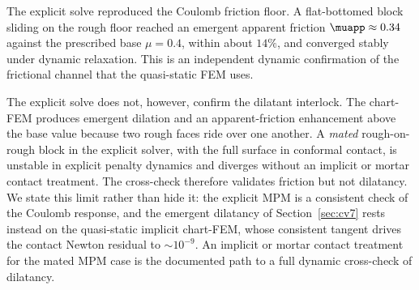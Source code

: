 The explicit solve reproduced the Coulomb friction floor. A flat-bottomed block sliding on the rough floor
reached an emergent apparent friction $\muapp\approx0.34$ against the prescribed base $\mu=0.4$, within
about $14\%$, and converged stably under dynamic relaxation. This is an independent dynamic confirmation
of the frictional channel that the quasi-static FEM uses.

The explicit solve does not, however, confirm the dilatant interlock. The chart-FEM produces emergent
dilation and an apparent-friction enhancement above the base value because two rough faces ride over one
another. A \emph{mated} rough-on-rough block in the explicit solver, with the full surface in conformal
contact, is unstable in explicit penalty dynamics and diverges without an implicit or mortar contact
treatment. The cross-check therefore validates friction but not dilatancy. We state this limit rather
than hide it: the explicit MPM is a consistent check of the Coulomb response, and the emergent dilatancy
of Section~\ref{sec:cv7} rests instead on the quasi-static implicit chart-FEM, whose consistent tangent
drives the contact Newton residual to $\sim10^{-9}$. An implicit or mortar contact treatment for the
mated MPM case is the documented path to a full dynamic cross-check of dilatancy.
